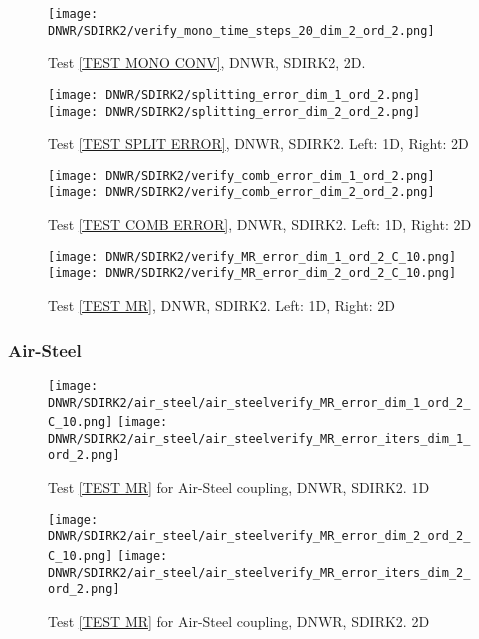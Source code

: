 \documentclass[a4paper,10pt]{article}
\begin{document}
\begin{figure}[!ht]
\texttt{[image: DNWR/SDIRK2/verify\_mono\_time\_steps\_20\_dim\_2\_ord\_2.png]}
\caption{Test \ref{TEST MONO CONV}, DNWR, SDIRK2, 2D.}
\label{FIG DNWR SDIRK2 2D MONO CONV}
\end{figure}

\begin{figure}[!ht]
\texttt{[image: DNWR/SDIRK2/splitting\_error\_dim\_1\_ord\_2.png]}
\texttt{[image: DNWR/SDIRK2/splitting\_error\_dim\_2\_ord\_2.png]}
\caption{Test \ref{TEST SPLIT ERROR}, DNWR, SDIRK2. Left: 1D, Right: 2D}
\label{FIG DNWR SDIRK2 SPLIT ERROR}
\end{figure}

\begin{figure}[!ht]
\texttt{[image: DNWR/SDIRK2/verify\_comb\_error\_dim\_1\_ord\_2.png]}
\texttt{[image: DNWR/SDIRK2/verify\_comb\_error\_dim\_2\_ord\_2.png]}
\caption{Test \ref{TEST COMB ERROR}, DNWR, SDIRK2. Left: 1D, Right: 2D}
\label{FIG DNWR SDIRK2 COMB ERROR}
\end{figure}

\begin{figure}[!ht]
\texttt{[image: DNWR/SDIRK2/verify\_MR\_error\_dim\_1\_ord\_2\_C\_10.png]}
\texttt{[image: DNWR/SDIRK2/verify\_MR\_error\_dim\_2\_ord\_2\_C\_10.png]}
\caption{Test \ref{TEST MR}, DNWR, SDIRK2. Left: 1D, Right: 2D}
\label{FIG DNWR SDIRK2 MR ERROR}
\end{figure}

\FloatBarrier
\subsubsection{Air-Steel}\label{SEC DNWR SDIRK2 AIR STEEL}
% 

\begin{figure}[!ht]
\texttt{[image: DNWR/SDIRK2/air\_steel/air\_steelverify\_MR\_error\_dim\_1\_ord\_2\_C\_10.png]}
\texttt{[image: DNWR/SDIRK2/air\_steel/air\_steelverify\_MR\_error\_iters\_dim\_1\_ord\_2.png]}
\caption{Test \ref{TEST MR} for Air-Steel coupling, DNWR, SDIRK2. 1D}
\label{FIG DNWR SDIRK2 AIR STEEL 1D}
\end{figure}

\begin{figure}[!ht]
\texttt{[image: DNWR/SDIRK2/air\_steel/air\_steelverify\_MR\_error\_dim\_2\_ord\_2\_C\_10.png]}
\texttt{[image: DNWR/SDIRK2/air\_steel/air\_steelverify\_MR\_error\_iters\_dim\_2\_ord\_2.png]}
\caption{Test \ref{TEST MR} for Air-Steel coupling, DNWR, SDIRK2. 2D}
\label{FIG DNWR SDIRK2 AIR STEEL 2D}
\end{figure}
\end{document}
